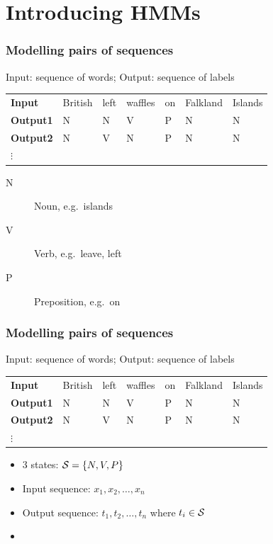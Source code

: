 
\usepackage{CJKutf8}



\section{Introducing HMMs}

\begin{frame}
\frametitle{Modelling pairs of sequences}
\begin{block}{Input: sequence of words; Output: sequence of labels}
\begin{tabular}{lllllll}
\textbf{Input} & British & left & waffles & on & Falkland & Islands \pause \\
\textbf{Output1} & N & N & V & P & N & N \\
\textbf{Output2} & N & V & N & P & N & N \\
$\vdots$ & & & & & & 
\end{tabular}

\begin{description}
\item[N] Noun, e.g.\ islands
\item[V] Verb, e.g.\ leave, left
\item[P] Preposition, e.g.\ on
\end{description}
\end{block}
\end{frame}

\begin{frame}
\frametitle{Modelling pairs of sequences}
\begin{block}{Input: sequence of words; Output: sequence of labels}
\begin{tabular}{lllllll}
\textbf{Input} & British & left & waffles & on & Falkland & Islands \pause \\
\textbf{Output1} & N & N & V & P & N & N \\
\textbf{Output2} & N & V & N & P & N & N \\
$\vdots$ & & & & & & 
\end{tabular}
\end{block}

\pause
\begin{block}{}
\begin{itemize}
\item 3 states: ${\cal S} = \{ N, V, P \}$
\item Input sequence: $x_1, x_2, \ldots, x_n$
\item Output sequence: $t_1, t_2, \ldots, t_n$ where $t_i \in {\cal S}$
\item {}
\end{itemize}
\end{block}
\end{frame}

